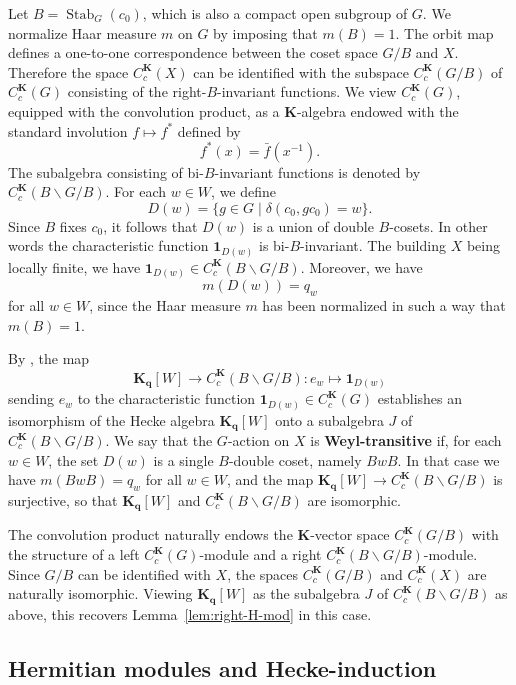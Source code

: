 \documentclass[12pt,a4paper]{amsproc}
\theoremstyle{definition}
\DeclareMathOperator{\Stab}{Stab}
\newcommand{\KK}{\mathbf K}
\newcommand{\one}{\mathbf 1}
\newcommand{\qq}{\mathbf q}
\begin{document}
Let $B=\Stab_G(c_0)$, which  is also a compact open subgroup of $G$. We normalize Haar measure $m$ on $G$ by imposing that $m(B)=1$. The orbit map defines a one-to-one correspondence between the coset space $G/B$ and $X$. Therefore the space $C^\KK_c(X)$ can be identified with the subspace $C^\KK_c(G/B)$ of $C^\KK_c(G)$ consisting of the right-$B$-invariant functions. We view $C^\KK_c(G)$, equipped with the convolution product,  as a $\KK$-algebra  endowed with the standard involution  $f \mapsto f^*$ defined by 
$$f^*(x) = \bar{f}(x^{-1}).$$ 
The subalgebra consisting of bi-$B$-invariant functions is denoted by $C^\KK_c(B\backslash G/B)$. For each $w \in W$, we define
$$D(w) = \{g \in G \mid \delta(c_0, gc_0) = w\}.$$
Since $B$ fixes $c_0$, it follows that $D(w)$ is a union of double $B$-cosets. In other words the characteristic function $\one_{D(w)}$ is bi-$B$-invariant. The building $X$ being locally finite, we have $\one_{D(w)} \in C^\KK_c(B\backslash G/B)$. Moreover, we have
$$m(D(w)) = q_w$$
for all $w \in W$, since the Haar measure $m$ has been normalized in such a way that $m(B)=1$. 

By \cite[Lemma~19.1.5]{Davis}, the map 
$$\KK_\qq[W] \to C^\KK_c(B\backslash G/B) : e_w \mapsto \one_{D(w)}$$
sending $e_w$ to the characteristic function $\one_{D(w)} \in C^\KK_c(G)$ establishes an isomorphism of the Hecke algebra $\KK_{\mathbf q}[W]$ onto a subalgebra $J$ of $C^\KK_c(B\backslash G/B)$.  We say that the $G$-action on $X$ is \textbf{Weyl-transitive} if, for each $w\in W$, the set $D(w)$ is a single $B$-double coset, namely $BwB$. In that case we have $m(BwB) = q_w$ for all $w \in W$, and the map  $\KK_\qq[W] \to C^\KK_c(B\backslash G/B)$  is surjective, so that $\KK_\qq[W] $ and $ C^\KK_c(B\backslash G/B)$ are isomorphic.

The convolution product naturally endows the $\KK$-vector space $C^\KK_c(G/B)$ with the structure of a left $C^\KK_c(G)$-module and a right $C^\KK_c(B\backslash G/B)$-module. 
Since $G/B$ can be identified with $X$, the spaces $C^\KK_c(G/B)$ and $C^\KK_c(X)$ are naturally isomorphic. Viewing   $\KK_{\mathbf q}[W]$ as the subalgebra $J$ of $C^\KK_c(B\backslash G/B)$ as above, this recovers  Lemma~\ref{lem:right-H-mod}  in this case. 

 
 
\subsection{Hermitian modules and Hecke-induction}\label{sec:Hecke-ind}
\end{document}
